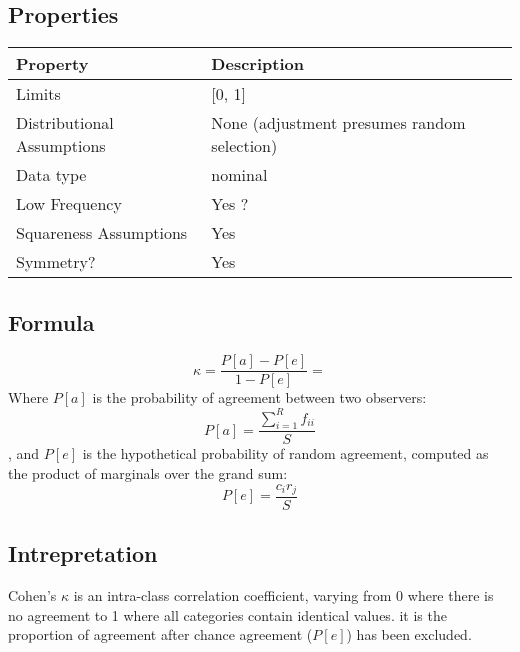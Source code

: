\documentclass[11pt]{article}
\begin{document}

\subsection{Properties}
\begin{tabular}{| l || l |}
    \hline
    {\bf Property} & {\bf Description} \\
    \hline
    Limits & [0, 1] \\ \hline

    Distributional Assumptions & None (adjustment presumes random selection) \\ \hline

    Data type & nominal \\ \hline

    Low Frequency & Yes {\color{red}?} \\ \hline

    Squareness Assumptions & Yes \\ \hline
    
    Symmetry? & Yes \\ \hline

\end{tabular}


\subsection{Formula}
$$
\kappa = \frac{P[a] - P[e]}{1-P[e]} =
$$
Where $P[a]$ is the probability of agreement between two observers:
$$
P[a] = \frac{ \sum_{i=1}^{R}f_{ii} }{ S }
$$
, and $P[e]$ is the hypothetical probability of random agreement, computed as the product of marginals over the grand sum:
$$
P[e] = \frac{ c_i r_j }{ S }
$$

\subsection{Intrepretation}
\label{section:cohenkappa:interpretation}
Cohen's $\kappa$ is an intra-class correlation coefficient, varying from 0 where there is no agreement to 1 where all categories contain identical values.  it is the proportion of agreement after chance agreement ($P[e]$) has been excluded. 
\end{document}
